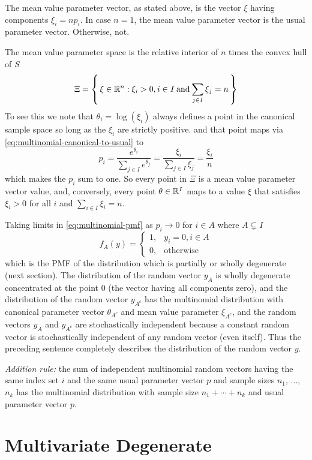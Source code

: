 The mean value parameter vector, as stated above, is the vector $\xi$ having
components $\xi_i = n p_i$.  In case $n = 1$, the mean value parameter vector
is the usual parameter vector.  Otherwise, not.

The mean value parameter space is the relative interior of $n$ times the
convex hull of $S$
$$
   \Xi
   =
   \left\{\,  \xi \in \mathbb{R}^n : \xi_i > 0, i \in I \mathbin{\rm and}
   \sum_{j \in I} \xi_j = n  \,\right\}
$$
To see this we note that $\theta_i = \log(\xi_i)$ always defines a point
in the canonical sample space so long as the $\xi_i$ are strictly positive.
and that point maps via \eqref{eq:multinomial-canonical-to-usual} to
$$
   p_i = \frac{e^{\theta_i}}{\sum_{j \in I} e^{\theta_j}}
   =
   \frac{\xi_i}{\sum_{j \in I} \xi_j} = \frac{\xi_i}{n}
$$
which makes the $p_i$ sum to one.
So every point in $\Xi$ is a mean value parameter vector value,
and, conversely, every point $\theta \in \mathbb{R}^I$ maps to a value $\xi$
that satisfies $\xi_i > 0$ for all $i$ and $\sum_{i \in I} \xi_i = n$.

Taking limits in \eqref{eq:multinomial-pmf} as $p_i \to 0$ for
$i \in A$ where $A \subsetneq I$
$$
   f_A(y) = \begin{cases} 1, & y_i = 0, i \in A \\ 0, & \text{otherwise}
   \end{cases}
$$
which is the PMF of the distribution which is partially or wholly degenerate
(next section).  The distribution of the random vector $y_A$
is wholly degenerate concentrated at the point 0 (the vector having all
components zero),
and the distribution of the random vector $y_{A^c}$ has the multinomial
distribution with canonical parameter vector $\theta_{A^c}$ and mean
value parameter $\xi_{A^c}$,
and the random vectors $y_A$ and $y_{A^c}$ are stochastically independent
because a constant random vector is stochastically independent of any
random vector (even itself).  Thus the preceding sentence completely describes
the distribution of the random vector $y$.

\emph{Addition rule:} the sum of independent multinomial random vectors
having the same index set $i$ and the same usual parameter vector $p$ and
sample sizes $n_1$, $\ldots,$ $n_k$ has the multinomial
distribution with sample size $n_1 + \cdots + n_k$ and
usual parameter vector $p$.

\section{Multivariate Degenerate} \label{app:sec:multivariate-degenerate}

